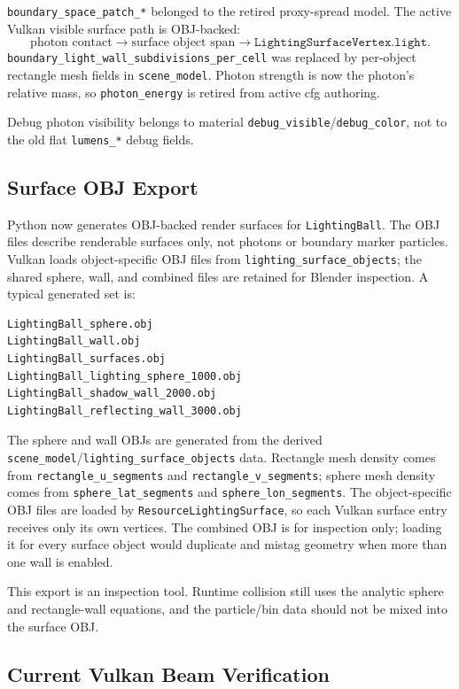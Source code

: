 \texttt{boundary\_space\_patch\_*} belonged to the retired proxy-spread model.
The active Vulkan visible surface path is OBJ-backed:
\[
    \textrm{photon contact}
    \rightarrow
    \textrm{surface object span}
    \rightarrow
    \texttt{LightingSurfaceVertex.light}.
\]
\texttt{boundary\_light\_wall\_subdivisions\_per\_cell} was replaced by
per-object rectangle mesh fields in \texttt{scene\_model}.  Photon strength is
now the photon's relative mass, so \texttt{photon\_energy} is retired from
active cfg authoring.

Debug photon visibility belongs to material
\texttt{debug\_visible}/\texttt{debug\_color}, not to the old flat
\texttt{lumens\_*} debug fields.

\subsection{Surface OBJ Export}

Python now generates OBJ-backed render surfaces for \texttt{LightingBall}.
The OBJ files describe renderable surfaces only, not photons or boundary
marker particles.  Vulkan loads object-specific OBJ files from
\texttt{lighting\_surface\_objects}; the shared sphere, wall, and combined
files are retained for Blender inspection.  A typical generated set is:
\begin{verbatim}
LightingBall_sphere.obj
LightingBall_wall.obj
LightingBall_surfaces.obj
LightingBall_lighting_sphere_1000.obj
LightingBall_shadow_wall_2000.obj
LightingBall_reflecting_wall_3000.obj
\end{verbatim}

The sphere and wall OBJs are generated from the derived
\texttt{scene\_model}/\texttt{lighting\_surface\_objects} data.  Rectangle
mesh density comes from \texttt{rectangle\_u\_segments} and
\texttt{rectangle\_v\_segments}; sphere mesh density comes from
\texttt{sphere\_lat\_segments} and \texttt{sphere\_lon\_segments}.  The
object-specific OBJ files are loaded by \texttt{ResourceLightingSurface}, so
each Vulkan surface entry receives only its own vertices.  The combined OBJ
is for inspection only; loading it for every surface object would duplicate
and mistag geometry when more than one wall is enabled.

This export is an inspection tool.  Runtime collision still uses the analytic
sphere and rectangle-wall equations, and the particle/bin data should not be
mixed into the surface OBJ.

\subsection{Current Vulkan Beam Verification}

